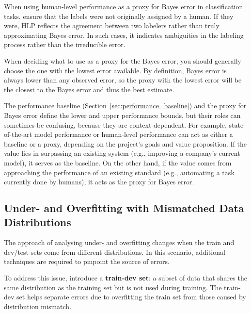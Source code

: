 \documentclass[12pt,openany, draft]{book}
\begin{document}
\begin{notebox}
When using human-level performance as a proxy for Bayes error in classification tasks, ensure that the labels were not originally assigned by a human. If they were, HLP reflects the agreement between two labelers rather than truly approximating Bayes error. In such cases, it indicates ambiguities in the labeling process rather than the irreducible error.
\end{notebox}

\begin{notebox}
When deciding what to use as a proxy for the Bayes error, you should generally choose the one with the lowest error available. By definition, Bayes error is always lower than any observed error, so the proxy with the lowest error will be the closest to the Bayes error and thus the best estimate. 
\end{notebox}

\begin{notebox}
The performance baseline (Section~\ref{sec:performance_baseline}) and the proxy for Bayes error define the lower and upper performance bounds, but their roles can sometimes be confusing, because they are context-dependent. For example, state-of-the-art model performance or human-level performance can act as either a baseline or a proxy, depending on the project’s goals and value proposition. If the value lies in surpassing an existing system (e.g., improving a company’s current model), it serves as the baseline. On the other hand, if the value comes from approaching the performance of an existing standard (e.g., automating a task currently done by humans), it acts as the proxy for Bayes error.
\end{notebox}


\subsection{Under- and Overfitting with Mismatched Data Distributions}
The approach of analysing under- and overfitting changes when the train and dev/test sets come from different distributions. In this scenario, additional techniques are required to pinpoint the source of errors. \newline

To address this issue, introduce a \textbf{train-dev set}: a subset of data that shares the same distribution as the training set but is not used during training. The train-dev set helps separate errors due to overfitting the train set from those caused by distribution mismatch.
\end{document}
